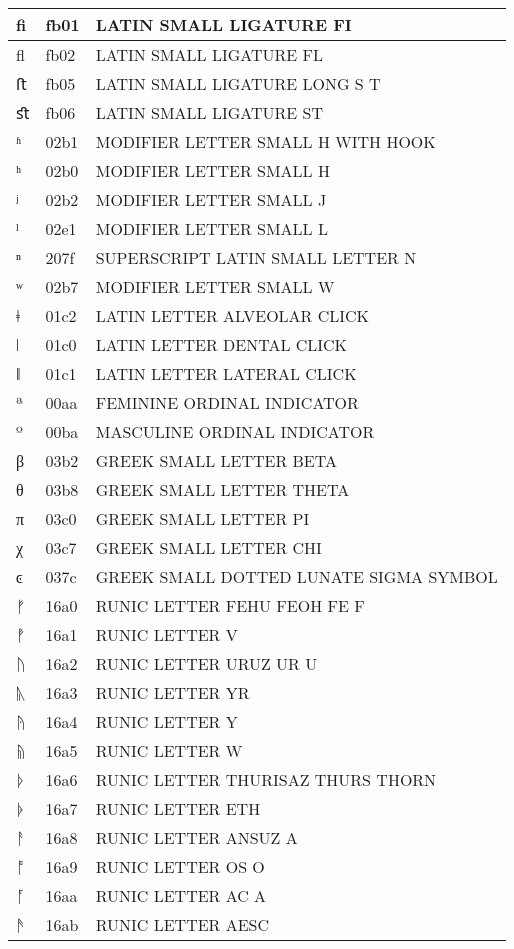 \documentclass[12pt,letterpaper,openany]{book}
\begin{document}
\begin{center}
\begin{supertabular}{|m{0.25in}|m{0.5in}|m{4in}|}
ﬁ & fb01 & LATIN SMALL LIGATURE FI\\\hline
ﬂ & fb02 & LATIN SMALL LIGATURE FL\\\hline
ﬅ & fb05 & LATIN SMALL LIGATURE LONG S T\\\hline
ﬆ & fb06 & LATIN SMALL LIGATURE ST\\\hline
ʱ & 02b1 & MODIFIER LETTER SMALL H WITH HOOK\\\hline
ʰ & 02b0 & MODIFIER LETTER SMALL H\\\hline
ʲ & 02b2 & MODIFIER LETTER SMALL J\\\hline
ˡ & 02e1 & MODIFIER LETTER SMALL L\\\hline
ⁿ & 207f & SUPERSCRIPT LATIN SMALL LETTER N\\\hline
ʷ & 02b7 & MODIFIER LETTER SMALL W\\\hline
ǂ & 01c2 & LATIN LETTER ALVEOLAR CLICK\\\hline
ǀ & 01c0 & LATIN LETTER DENTAL CLICK\\\hline
ǁ & 01c1 & LATIN LETTER LATERAL CLICK\\\hline
ª & 00aa & FEMININE ORDINAL INDICATOR\\\hline
º & 00ba & MASCULINE ORDINAL INDICATOR\\\hline
β & 03b2 & GREEK SMALL LETTER BETA\\\hline
θ & 03b8 & GREEK SMALL LETTER THETA\\\hline
π & 03c0 & GREEK SMALL LETTER PI\\\hline
χ & 03c7 & GREEK SMALL LETTER CHI\\\hline
ͼ & 037c & GREEK SMALL DOTTED LUNATE SIGMA SYMBOL\\\hline
ᚠ & 16a0 & RUNIC LETTER FEHU FEOH FE F\\\hline
ᚡ & 16a1 & RUNIC LETTER V\\\hline
ᚢ & 16a2 & RUNIC LETTER URUZ UR U\\\hline
ᚣ & 16a3 & RUNIC LETTER YR\\\hline
ᚤ & 16a4 & RUNIC LETTER Y\\\hline
ᚥ & 16a5 & RUNIC LETTER W\\\hline
ᚦ & 16a6 & RUNIC LETTER THURISAZ THURS THORN\\\hline
ᚧ & 16a7 & RUNIC LETTER ETH\\\hline
ᚨ & 16a8 & RUNIC LETTER ANSUZ A\\\hline
ᚩ & 16a9 & RUNIC LETTER OS O\\\hline
ᚪ & 16aa & RUNIC LETTER AC A\\\hline
ᚫ & 16ab & RUNIC LETTER AESC\\\hline

\end{supertabular}
\end{center}
\end{document}

